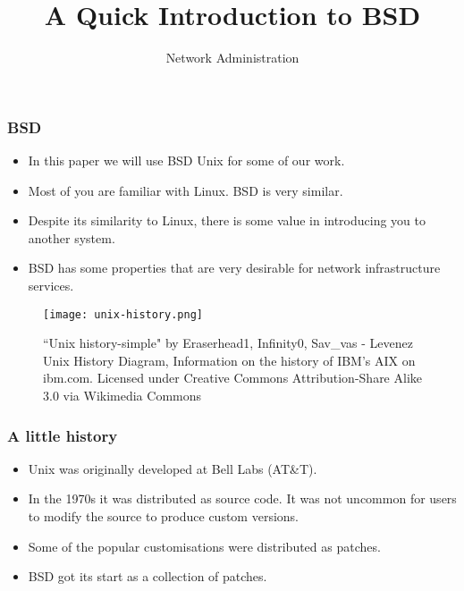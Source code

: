 \documentclass[10pt]{beamer}
\title{A Quick Introduction to BSD}
\author[IN715]{Network Administration}
\institute[Otago Polytechnic]{
  Otago Polytechnic \\
  Dunedin, New Zealand \\
}
\date{}
\begin{document}
\begin{frame}[plain]
  \titlepage
\end{frame}



\begin{frame}
  \frametitle{BSD}
  \begin{itemize}
    \item In this paper we will use BSD Unix for some of our work.
    \item Most of you are familiar with Linux.  BSD is very similar.
    \item Despite its similarity to Linux, there is some value in 
          introducing you to another system.
    \item BSD has some properties that are very desirable for 
          network infrastructure services.
  \end{itemize}  
\end{frame}

\begin{frame}
    \begin{figure}[h!]
    \texttt{[image: unix-history.png]}

\caption{``Unix history-simple" by Eraserhead1, Infinity0, Sav\_vas - Levenez Unix History Diagram, Information on the history of IBM's AIX on ibm.com. Licensed under Creative Commons Attribution-Share Alike 3.0 via Wikimedia Commons}
    \end{figure}
\end{frame}


\begin{frame}
  \frametitle{A little history}
  \begin{itemize}
    \item Unix was originally developed at Bell Labs (AT\&T).
    \item In the 1970s it was distributed as source code.  It
          was not uncommon for users to modify the source to produce
          custom versions.
    \item Some of the popular customisations were distributed as patches.
    \item BSD got its start as a collection of patches.
  \end{itemize}  
\end{frame}
\end{document}
